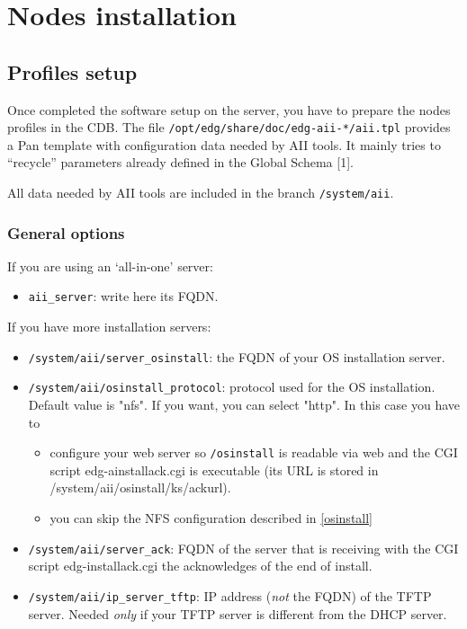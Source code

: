 \documentclass{datagridreport}
\begin{document}
\chapter{Nodes installation} \label{nodesinstall}
\section{Profiles setup}
Once completed the software setup on the server, you have to prepare the
nodes profiles in the CDB. The file \texttt{/opt/edg/share/doc/edg-aii-*/aii.tpl}
provides a Pan template with configuration data needed by AII tools.
It mainly tries to ``recycle'' parameters already defined in the Global Schema [1].

All data needed by AII tools are included in the branch \texttt{/system/aii}.

\subsection{General options}
If you are using an `all-in-one' server:
\begin{itemize}
\item \texttt{aii\_server}: write here its FQDN.
\end{itemize}

If you have more installation servers:
\begin{itemize}
\item \texttt{/system/aii/server\_osinstall}: the FQDN of your OS installation server.
\item \texttt{/system/aii/osinstall\_protocol}: protocol used for the OS installation.
      Default value is "nfs". If you want, you can select "http". In this case you have to
      \begin{itemize}
      \item configure your web server so \texttt{/osinstall} is readable via web and
      the CGI script edg-ainstallack.cgi is executable (its URL is stored in
      /system/aii/osinstall/ks/ackurl).
      \item you can skip the NFS configuration described in \ref{osinstall}
      \end{itemize}
\item \texttt{/system/aii/server\_ack}: FQDN of the server that is receiving
      with the CGI script edg-installack.cgi the acknowledges of the end of install.
\item \texttt{/system/aii/ip\_server\_tftp}: IP address (\emph{not} the FQDN) of the
      TFTP server. Needed \emph{only} if your TFTP server is different from the DHCP server.
\end{itemize}
\end{document}
